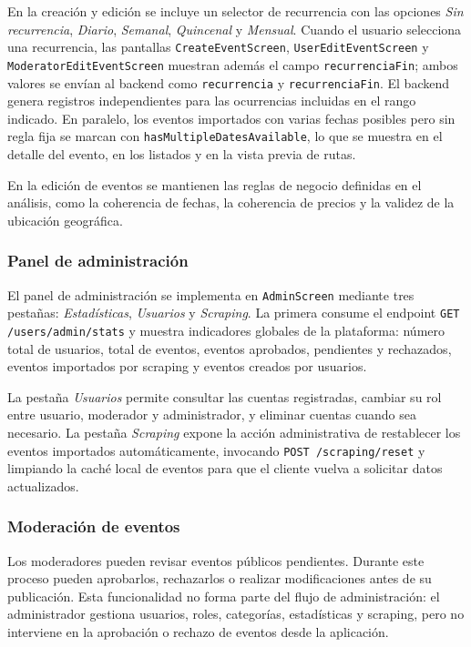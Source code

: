 En la creación y edición se incluye un selector de recurrencia con las opciones \textit{Sin recurrencia}, \textit{Diario}, \textit{Semanal}, \textit{Quincenal} y \textit{Mensual}. Cuando el usuario selecciona una recurrencia, las pantallas \texttt{CreateEventScreen}, \texttt{UserEditEventScreen} y \texttt{ModeratorEditEventScreen} muestran además el campo \texttt{recurrenciaFin}; ambos valores se envían al backend como \texttt{recurrencia} y \texttt{recurrenciaFin}. El backend genera registros independientes para las ocurrencias incluidas en el rango indicado. En paralelo, los eventos importados con varias fechas posibles pero sin regla fija se marcan con \texttt{hasMultipleDatesAvailable}, lo que se muestra en el detalle del evento, en los listados y en la vista previa de rutas.

En la edición de eventos se mantienen las reglas de negocio definidas en el análisis, como la coherencia de fechas, la coherencia de precios y la validez de la ubicación geográfica.

\subsubsection{Panel de administración}

El panel de administración se implementa en \texttt{AdminScreen} mediante tres pestañas: \textit{Estadísticas}, \textit{Usuarios} y \textit{Scraping}. La primera consume el endpoint \texttt{GET /users/admin/stats} y muestra indicadores globales de la plataforma: número total de usuarios, total de eventos, eventos aprobados, pendientes y rechazados, eventos importados por scraping y eventos creados por usuarios.

La pestaña \textit{Usuarios} permite consultar las cuentas registradas, cambiar su rol entre usuario, moderador y administrador, y eliminar cuentas cuando sea necesario. La pestaña \textit{Scraping} expone la acción administrativa de restablecer los eventos importados automáticamente, invocando \texttt{POST /scraping/reset} y limpiando la caché local de eventos para que el cliente vuelva a solicitar datos actualizados.

\subsubsection{Moderación de eventos}

Los moderadores pueden revisar eventos públicos pendientes. Durante este proceso pueden aprobarlos, rechazarlos o realizar modificaciones antes de su publicación. Esta funcionalidad no forma parte del flujo de administración: el administrador gestiona usuarios, roles, categorías, estadísticas y scraping, pero no interviene en la aprobación o rechazo de eventos desde la aplicación.

